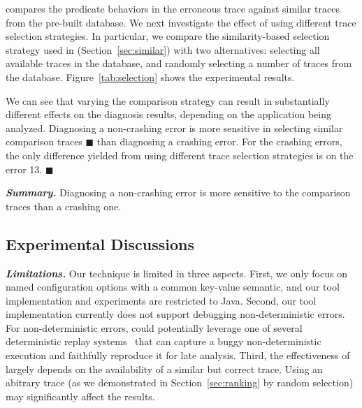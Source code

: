 \ourtool compares the predicate behaviors in the erroneous trace against
similar traces from the pre-built database.
We next investigate the effect of using different trace selection strategies.
In particular, we compare the similarity-based selection strategy used in \ourtool
 (Section~\ref{sec:similar}) with two alternatives: selecting
all available traces in the database, and
randomly selecting a number of traces from the database.
Figure~\ref{tab:selection} shows the experimental results.

We can see that varying the comparison strategy can result in
substantially different effects on the diagnosis results,
depending on the application being analyzed. Diagnosing
a non-crashing error is more sensitive in selecting similar
comparison traces $\blacksquare$ than diagnosing
a crashing error.
For the \crash crashing errors, the only difference yielded
from using different trace selection strategies is on
the error 13. $\blacksquare$


\vspace{1mm}
\noindent \textbf{\textit{Summary.}} Diagnosing a non-crashing
error is more sensitive to the comparison traces than a crashing one.


\subsection{Experimental Discussions}


\noindent \textbf{\textit{Limitations.}} 
Our technique is limited in three aspects.
First, we only focus on named configuration options
with a common key-value semantic, and our tool implementation
and experiments are
restricted to Java. 
Second,  our tool implementation currently does not
support debugging non-deterministic errors. 
For non-deterministic errors, \ourtool could potentially leverage one of
several deterministic replay systems~\cite{Huang:2010:LLD}
that can capture a buggy non-deterministic
execution and faithfully reproduce it for late analysis.
Third, the effectiveness of \ourtool largely
depends on the availability of a similar but correct trace.
Using an abitrary trace (as we demonstrated in Section~\ref{sec:ranking}
by random selection) may significantly affect the results.




